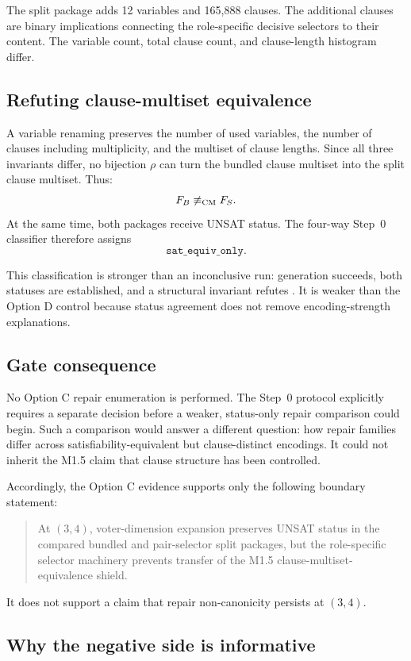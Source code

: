 The split package adds 12 variables and 165,888 clauses.  The additional
clauses are binary implications connecting the role-specific decisive
selectors to their content.  The variable count, total clause count, and
clause-length histogram differ.

\subsection{Refuting clause-multiset equivalence}

A variable renaming preserves the number of used variables, the number of
clauses including multiplicity, and the multiset of clause lengths.  Since all
three invariants differ, no bijection $\rho$ can turn the bundled clause
multiset into the split clause multiset.  Thus:
\[
  F_B\not\equiv_{\mathrm{CM}} F_S.
\]
At the same time, both packages receive UNSAT status.  The four-way Step~0 classifier
therefore assigns
\[
  \mathtt{sat\_equiv\_only}.
\]

This classification is stronger than an inconclusive run: generation succeeds,
both statuses are established, and a structural invariant refutes \CM.  It is
weaker than the Option D control because status agreement does not remove
encoding-strength explanations.

\subsection{Gate consequence}

No Option C repair enumeration is performed.  The Step~0 protocol explicitly
requires a separate decision before a weaker, status-only repair comparison
could begin.  Such a comparison would answer a different question: how repair
families differ across satisfiability-equivalent but clause-distinct encodings.
It could not inherit the M1.5 claim that clause structure has been controlled.

Accordingly, the Option C evidence supports only the following boundary
statement:
\begin{quote}
At $(3,4)$, voter-dimension expansion preserves UNSAT status in the compared
bundled and pair-selector split packages, but the role-specific selector
machinery prevents transfer of the M1.5 clause-multiset-equivalence shield.
\end{quote}
It does not support a claim that repair non-canonicity persists at $(3,4)$.

\subsection{Why the negative side is informative}


